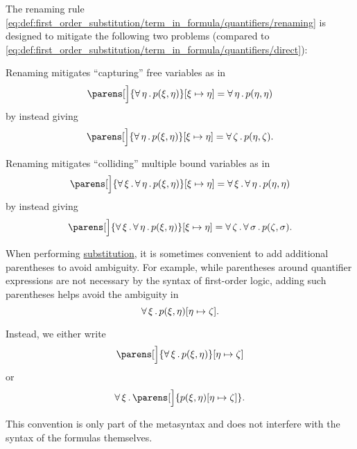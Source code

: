 \begin{remark}\label{rem:first_order_substitution_renaming_justification}
  The renaming rule \eqref{eq:def:first_order_substitution/term_in_formula/quantifiers/renaming} is designed to mitigate the following two problems (compared to \eqref{eq:def:first_order_substitution/term_in_formula/quantifiers/direct}):

  \begin{thmenum}
     Renaming mitigates \enquote{capturing} free variables as in
    \begin{equation*}
      \parens[\Big]{ \qforall{\eta} p(\xi, \eta) }[\xi \mapsto \eta] = \qforall{\eta} p(\eta, \eta)
    \end{equation*}
    by instead giving
    \begin{equation*}
      \parens[\Big]{ \qforall{\eta} p(\xi, \eta) }[\xi \mapsto \eta] = \qforall{\zeta} p(\eta, \zeta).
    \end{equation*}

     Renaming mitigates \enquote{colliding} multiple bound variables as in
    \begin{equation*}
      \parens[\Big]{ \qforall{\xi} \qforall{\eta} p(\xi, \eta) }[\xi \mapsto \eta] = \qforall{\xi} \qforall{\eta} p(\eta, \eta)
    \end{equation*}
    by instead giving
    \begin{equation*}
      \parens[\Big]{ \qforall{\xi} \qforall{\eta} p(\xi, \eta) }[\xi \mapsto \eta] = \qforall{\zeta} \qforall{\sigma} p(\zeta, \sigma).
    \end{equation*}
  \end{thmenum}
\end{remark}

\begin{remark}\label{rem:first_order_substitution_parentheses}
  When performing \hyperref[def:propositional_substitution]{substitution}, it is sometimes convenient to add additional parentheses to avoid ambiguity. For example, while parentheses around quantifier expressions are not necessary by the syntax of first-order logic, adding such parentheses helps avoid the ambiguity in
  \begin{equation*}
    \forall \, \xi \, . \, p(\xi, \eta) [\eta \mapsto \zeta].
  \end{equation*}

  Instead, we either write
  \begin{equation*}
    \parens[\Big]{ \qforall{\xi} p(\xi, \eta) } [\eta \mapsto \zeta]
  \end{equation*}
  or
  \begin{equation*}
    \qforall{\xi} \parens[\Big]{ p(\xi, \eta)[\eta \mapsto \zeta] }.
  \end{equation*}

  This convention is only part of the metasyntax and does not interfere with the syntax of the formulas themselves.
\end{remark}

